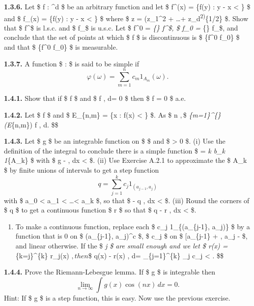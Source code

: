\documentclass[
  letterpaper,
  DIV=11,
  numbers=noendperiod]{scrartcl}
\providecommand{\tightlist}{%
  \setlength{\itemsep}{0pt}\setlength{\parskip}{0pt}}\usepackage{longtable,booktabs,array}
\begin{document}
\textbf{1.3.6.} Let \$ f : \^{}d \to {} \$ be an
arbitrary function and let \$ f\^{}\delta(x) = \sup\{f(y) : \textbar y -
x\textbar{} \textless{} \delta\} \$ and \$ f\_\delta(x) = \inf\{f(y) :
\textbar y - x\textbar{} \textless{} \delta\} \$ where \$
\textbar z\textbar{} = (z\_1\^{}2 + \dots +
z\_d\textsuperscript{2)}\{1/2\} \$. Show that \$ f\^{}\delta \$ is
l.s.c. and \$ f\_\delta \$ is u.s.c. Let \$ f\^{}0 =
\lim\emph{\{\delta {}\} f\^{}\delta \$, \$ f\_0 =
\lim}\{\delta {}\} f\_\delta \$, and conclude that the set of points
at which \$ f \$ is discontinuous is \$ \{f\^{}0 \neq f\_0\} \$ and that
\$ \{f\^{}0 \neq f\_0\} \$ is measurable.

\textbf{1.3.7.} A function \$ \varphi : \Omega \to {} \$ is said
to be simple if \[
\varphi(\omega) = \sum_{m=1}^{n} c_m 1_{A_m} (\omega).
\]

\textbf{1.4.1.} Show that if \$ f  \$ and \$ \int f , d\mu = 0 \$
then \$ f = 0 \$ a.e.

\textbf{1.4.2.} Let \$ f  \$ and \$ E\_\{n,m\} = \{x :
 \leq f(x) \textless{} \} \$. As \$ n
\to \infty \(,\)\$ \sum\emph{\{m=1\}\^{}\{\infty\} 
\mu(E}\{n,m\}) \uparrow \int f , d\mu. \$\$

\textbf{1.4.3.} Let \$ g \$ be an integrable function on \$ 
\$ and \$ \epsilon \textgreater{} 0 \$. (i) Use the definition of the
integral to conclude there is a simple function \$ \varphi = \sum\emph{k
b\_k 1}\{A\_k\} \$ with \$ \int \textbar g - \varphi\textbar{} , dx
\textless{} \epsilon \$. (ii) Use Exercise A.2.1 to approximate the \$
A\_k \$ by finite unions of intervals to get a step function \[
q = \sum_{j=1}^{k} c_j 1_{(a_{j-1}, a_j)}
\] with \$ a\_0 \textless{} a\_1 \textless{} \dots \textless{} a\_k \$,
so that \$ \int \textbar{}\varphi - q\textbar{} , dx \textless{}
\epsilon \$. (iii) Round the corners of \$ q \$ to get a continuous
function \$ r \$ so that \$ \int \textbar q - r\textbar{} , dx
\textless{} \epsilon \$.

\begin{enumerate}
\def\labelenumi{(\roman{enumi})}
\setcounter{enumi}{2}
\tightlist
\item
  To make a continuous function, replace each \$ c\_j 1\_\{(a\_\{j-1\},
  a\_j)\} \$ by a function that is 0 on \$ (a\_\{j-1\}, a\_j)\^{}c \$,
  \$ c\_j \$ on \$ {[}a\_\{j-1\} + \delta, a\_j - \delta{]} \$, and
  linear otherwise. If the \$ \delta\emph{j \$ are small enough and we
  let \$ r(x) = \sum}\{k=j\}\^{}\{k\} r\_j(x) \(, then\)\$
  \int \textbar q(x) - r(x)\textbar{} , d\mu = \sum\_\{j=1\}\^{}\{k\}
  \delta\_j c\_j \textless{} \epsilon. \$\$
\end{enumerate}

\textbf{1.4.4.} Prove the Riemann-Lebesgue lemma. If \$ g \$ is
integrable then \[
\lim_{n \to \infty} \int g(x) \cos(nx) \, dx = 0.
\] Hint: If \$ g \$ is a step function, this is easy. Now use the
previous exercise.
\end{document}
